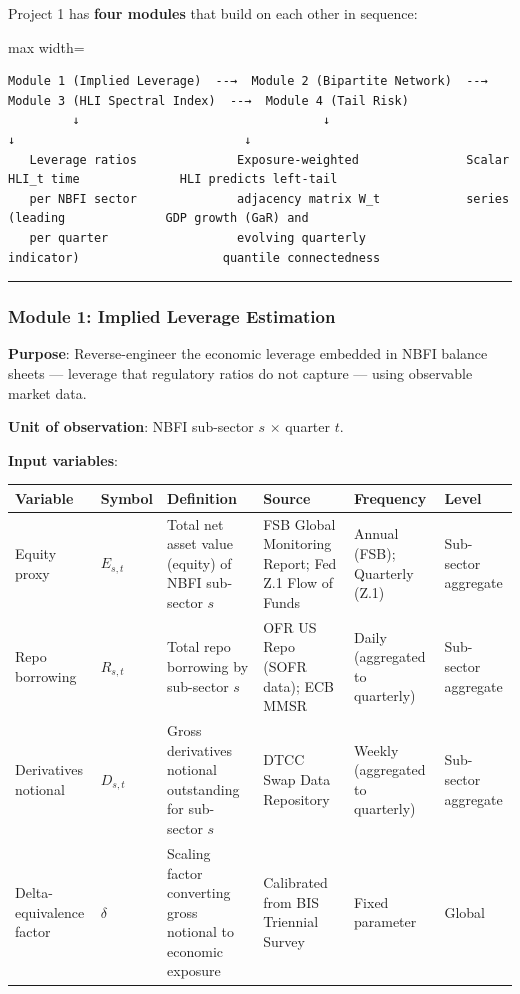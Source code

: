 \documentclass[11pt,a4paper]{article}
\begin{document}
Project 1 has \textbf{four modules} that build on each other in sequence:


\begin{adjustbox}{max width=\textwidth}
\begin{minipage}{1.5\textwidth}
\begin{verbatim}
Module 1 (Implied Leverage)  --→  Module 2 (Bipartite Network)  --→  Module 3 (HLI Spectral Index)  --→  Module 4 (Tail Risk)
         ↓                                  ↓                                  ↓                                ↓
   Leverage ratios              Exposure-weighted               Scalar HLI_t time              HLI predicts left-tail
   per NBFI sector              adjacency matrix W_t            series (leading              GDP growth (GaR) and
   per quarter                  evolving quarterly              indicator)                    quantile connectedness
\end{verbatim}
\end{minipage}
\end{adjustbox}


\bigskip\noindent\rule{\textwidth}{0.4pt}\bigskip


\subsubsection{Module 1: Implied Leverage Estimation}

\textbf{Purpose}: Reverse-engineer the economic leverage embedded in NBFI balance sheets --- leverage that regulatory ratios do not capture --- using observable market data.

\textbf{Unit of observation}: NBFI sub-sector $s$ $\times$ quarter $t$.

\textbf{Input variables}:


{\small
\begin{longtable}{|p{}|p{}|p{}|p{}|p{}|p{}|}
\hline
\textbf{Variable} & \textbf{Symbol} & \textbf{Definition} & \textbf{Source} & \textbf{Frequency} & \textbf{Level} \\
\hline
\endhead
Equity proxy & $E_{s,t}$ & Total net asset value (equity) of NBFI sub-sector $s$ & FSB Global Monitoring Report; Fed Z.1 Flow of Funds & Annual (FSB); Quarterly (Z.1) & Sub-sector aggregate \\
\hline
Repo borrowing & $R_{s,t}$ & Total repo borrowing by sub-sector $s$ & OFR US Repo (SOFR data); ECB MMSR & Daily (aggregated to quarterly) & Sub-sector aggregate \\
\hline
Derivatives notional & $D_{s,t}$ & Gross derivatives notional outstanding for sub-sector $s$ & DTCC Swap Data Repository & Weekly (aggregated to quarterly) & Sub-sector aggregate \\
\hline
Delta-equivalence factor & $\delta$ & Scaling factor converting gross notional to economic exposure & Calibrated from BIS Triennial Survey & Fixed parameter & Global \\
\hline
\end{longtable}
}
\end{document}
